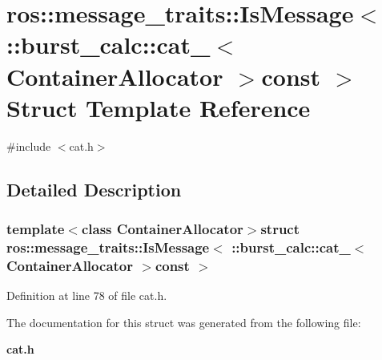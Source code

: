 \section{ros\-:\-:message\-\_\-traits\-:\-:\-Is\-Message$<$ \-:\-:burst\-\_\-calc\-:\-:cat\-\_\-$<$ \-Container\-Allocator $>$const $>$ \-Struct \-Template \-Reference}
\label{structros_1_1message__traits_1_1IsMessage_3_01_1_1burst__calc_1_1cat___3_01ContainerAllocator_01_4const_01_01_4}


{\ttfamily \#include $<$cat.\-h$>$}



\subsection{\-Detailed \-Description}
\subsubsection*{template$<$class Container\-Allocator$>$struct ros\-::message\-\_\-traits\-::\-Is\-Message$<$ \-::burst\-\_\-calc\-::cat\-\_\-$<$ Container\-Allocator $>$const  $>$}



\-Definition at line 78 of file cat.\-h.



\-The documentation for this struct was generated from the following file\-:\begin{DoxyCompactItemize}
\item 
{\bf cat.\-h}\end{DoxyCompactItemize}
